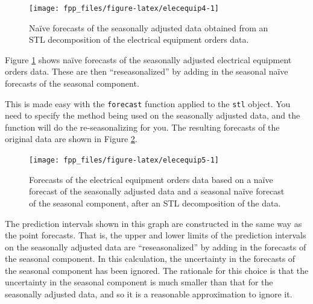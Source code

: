 \documentclass[]{book}
\newenvironment{Shaded}{\begin{snugshade}}{\end{snugshade}}
\newcommand{\DataTypeTok}[1]{\textcolor[rgb]{0.13,0.29,0.53}{#1}}
\newcommand{\KeywordTok}[1]{\textcolor[rgb]{0.13,0.29,0.53}{\textbf{#1}}}
\newcommand{\NormalTok}[1]{#1}
\newcommand{\OperatorTok}[1]{\textcolor[rgb]{0.81,0.36,0.00}{\textbf{#1}}}
\newcommand{\StringTok}[1]{\textcolor[rgb]{0.31,0.60,0.02}{#1}}
\begin{document}
\begin{figure}

{\centering \texttt{[image: fpp\_files/figure-latex/elecequip4-1]} 

}

\caption{Naïve forecasts of the seasonally adjusted data obtained from an STL decomposition of the electrical equipment orders data.}\label{fig:elecequip4}
\end{figure}

Figure \ref{fig:elecequip4} shows naïve forecasts of the seasonally adjusted electrical equipment orders data. These are then ``reseasonalized'' by adding in the seasonal naïve forecasts of the seasonal component.

This is made easy with the \texttt{forecast} function applied to the \texttt{stl} object. You need to specify the method being used on the seasonally adjusted data, and the function will do the re-seasonalizing for you. The resulting forecasts of the original data are shown in Figure \ref{fig:elecequip5}.

\begin{Shaded}
\end{Shaded}

\begin{figure}

{\centering \texttt{[image: fpp\_files/figure-latex/elecequip5-1]} 

}

\caption{Forecasts of the electrical equipment orders data based on a naïve forecast of the seasonally adjusted data and a seasonal naïve forecast of the seasonal component, after an STL decomposition of the data.}\label{fig:elecequip5}
\end{figure}

The prediction intervals shown in this graph are constructed in the same way as the point forecasts. That is, the upper and lower limits of the prediction intervals on the seasonally adjusted data are ``reseasonalized'' by adding in the forecasts of the seasonal component. In this calculation, the uncertainty in the forecasts of the seasonal component has been ignored. The rationale for this choice is that the uncertainty in the seasonal component is much smaller than that for the seasonally adjusted data, and so it is a reasonable approximation to ignore it.
\end{document}
